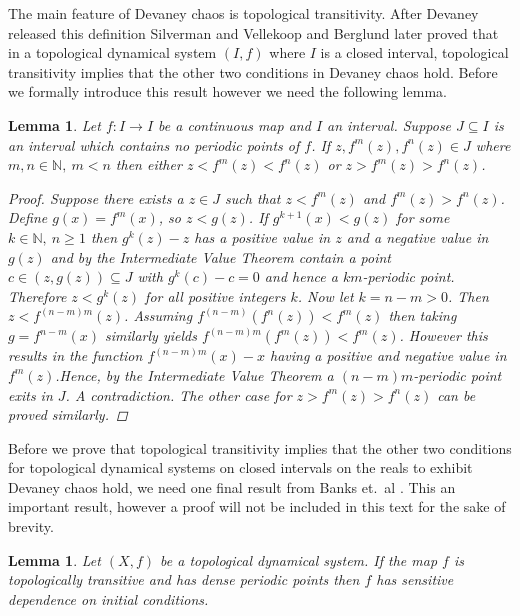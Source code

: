 \documentclass[11pt,a4paper,oneside]{memoir}
\theoremstyle{plain}
\newtheorem{lem}[thm]{Lemma}
\theoremstyle{definition}
\begin{document}
The main feature of Devaney chaos is topological transitivity. After Devaney released this definition Silverman \cite{silverman} and Vellekoop and Berglund \cite{vellekoop-berglund} later proved that in a topological dynamical system $(I, f)$ where $I$ is a closed interval, topological transitivity implies that the other two conditions in Devaney chaos hold. Before we formally introduce this result however we need the following lemma.

\begin{lem} \label{lem:noperiodic}
    Let $f: I \to I$ be a continuous map and $I$ an interval. Suppose $J \subseteq I$ is an interval which contains no periodic points of $f$. If $z, f^m(z), f^n(z) \in J$ where $m, n \in \mathbb{N}, \ m < n$ then either $z < f^m(z) < f^n(z)$ or $z > f^m(z) > f^n(z)$.
    \begin{proof}
        Suppose there exists a $z \in J$ such that $z < f^m(z)$ and $f^m(z) > f^n(z)$. Define $g(x) = f^m(x)$, so $z < g(z)$. If $g^{k+1}(x) < g(z)$ for some $k \in \mathbb{N}, \ n \geq 1$ then $g^k(z) - z$ has a positive value in $z$ and a negative value in $g(z)$ and by the Intermediate Value Theorem contain a point $c \in (z, g(z)) \subseteq J$ with $g^k(c) - c = 0$ and hence a $km$-periodic point. Therefore $z < g^k(z)$ for all positive integers $k$. Now let $k = n - m > 0$. Then $z < f^{(n - m)m}(z)$. Assuming $f^{(n-m)}(f^n(z)) < f^m(z)$ then taking $g = f^{n-m}(x)$ similarly yields $f^{(n-m)m}(f^m(z)) < f^m(z)$. However this results in the function $f^{(n-m)m}(x) - x$ having a positive and negative value in $f^m(z)$.Hence, by the Intermediate Value Theorem a $(n-m)m$-periodic point exits in $J$. A contradiction. The other case for $z > f^m(z) > f^n(z)$ can be proved similarly.
    \end{proof}
\end{lem}

Before we prove that topological transitivity implies that the other two conditions for topological dynamical systems on closed intervals on the reals to exhibit Devaney chaos hold, we need one final result from Banks et.\ al \cite{bbcds}. This an important result, however a proof will not be included in this text for the sake of brevity.

\begin{lem} \label{lem:implies-sdic}
    Let $(X, f)$ be a topological dynamical system. If the map $f$ is topologically transitive and has dense periodic points then $f$ has sensitive dependence on initial conditions.
\end{lem}
\end{document}
